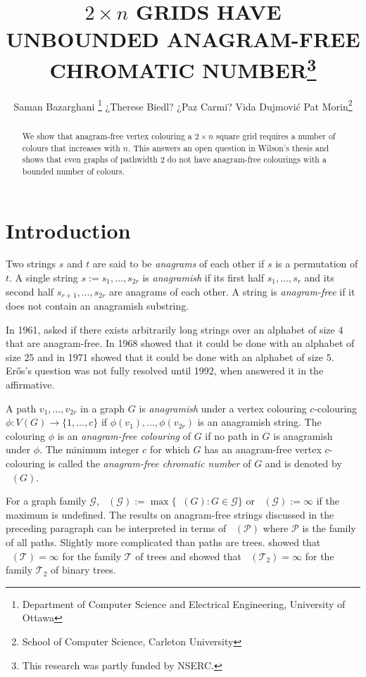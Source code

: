 \documentclass{patmorin}
\title{\MakeUppercase{$2\times n$ Grids have Unbounded Anagram-Free Chromatic Number}\thanks{This research was partly funded by NSERC.}}
\author{Saman Bazarghani%
    \thanks{Department of Computer Science and Electrical Engineering, University of Ottawa}\qquad
    ¿Therese Biedl?%
    \qquad
    ¿Paz Carmi?\qquad
    Vida Dujmović\footnotemark[2]\qquad
    Pat Morin\footnotemark[3]%
    \thanks{School of Computer Science, Carleton University}}
\DeclareMathOperator{\afcn}{\dot{\chi}_\pi}
\begin{document}
\maketitle

\begin{abstract}
    We show that anagram-free vertex colouring a $2\times n$ square grid requires a number of colours that increases with $n$.  This answers an open question in Wilson's thesis and shows that even graphs of pathwidth 2 do not have anagram-free colourings with a bounded number of colours.
\end{abstract}

%



\section{Introduction}

Two strings $s$ and $t$ are said to be \emph{anagrams} of each other if $s$ is a permutation of $t$.  A single string $s:=s_1,\ldots,s_{2r}$ is \emph{anagramish} if its first half $s_1,\ldots,s_r$ and its second half $s_{r+1},\ldots,s_{2r}$ are anagrams of each other.  A string is \emph{anagram-free} if it does not contain an anagramish substring.

In 1961, \citet{erdos:some} asked if there exists arbitrarily long strings over an alphabet of size $4$ that are anagram-free.  In 1968 \citet{evdokimov:strongly,evdokimov:strongly} showed that it could be done with an alphabet of size $25$ and in 1971 \citet{pleasants:non-repetitive} showed that it could be done with an alphabet of size $5$.  Er\H{o}s's question was not fully resolved until 1992, when \cite{keranen:abelian} answered it in the affirmative.

A path $v_1,\ldots,v_{2r}$ in a graph $G$ is \emph{anagramish} under a vertex colouring $c$-colouring $\phi:V(G)\to\{1,\ldots,c\}$ if $\phi(v_1),\ldots,\phi(v_{2r})$ is an anagramish string.  The colouring $\phi$ is an \emph{anagram-free colouring} of $G$ if no path in $G$ is anagramish under $\phi$.  The minimum integer $c$ for which $G$ has an anagram-free vertex $c$-colouring is called the \emph{anagram-free chromatic number} of $G$ and is denoted by $\afcn(G)$.

For a graph family $\mathcal{G}$, $\afcn(\mathcal{G}):=\max\{\afcn(G):G\in\mathcal{G}\}$ or $\afcn(\mathcal{G}):=\infty$ if the maximum is undefined. The results on anagram-free strings discussed in the preceding paragraph can be interpreted in terms of $\afcn(\mathcal{P})$ where $\mathcal{P}$ is the family of all paths.  Slightly more complicated than paths are trees.  \citet{wilson.wood:anagram-free} showed that $\afcn(\mathcal{T})=\infty$ for the family $\mathcal{T}$ of trees and \citet{kamcev.luczak.ea:anagram-free} showed that $\afcn(\mathcal{T_2})=\infty$ for the family $\mathcal{T}_2$ of binary trees.
\end{document}
